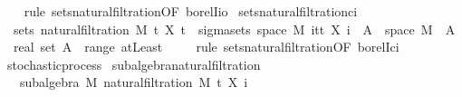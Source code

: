 \begin{isabellebody}
%
\isadelimproof
\ \ %
\endisadelimproof
%
\isatagproof
{}\isamarkupfalse%
\ {\isacharparenleft}{\kern0pt}rule\ sets{\isacharunderscore}{\kern0pt}natural{\isacharunderscore}{\kern0pt}filtration{\isacharprime}{\kern0pt}{\isacharbrackleft}{\kern0pt}OF\ borel{\isacharunderscore}{\kern0pt}Iio{\isacharbrackright}{\kern0pt}{\isacharparenright}{\kern0pt}%
\endisatagproof
{\isafoldproof}%
%
\isadelimproof
\isanewline
%
\endisadelimproof
\isanewline
{}\isamarkupfalse%
\ sets{\isacharunderscore}{\kern0pt}natural{\isacharunderscore}{\kern0pt}filtration{\isacharunderscore}{\kern0pt}ci{\isacharcolon}{\kern0pt}\isanewline
\ \ {\isachardoublequoteopen}sets\ {\isacharparenleft}{\kern0pt}natural{\isacharunderscore}{\kern0pt}filtration\ M\ t\ X\ t{\isacharparenright}{\kern0pt}\ {\isacharequal}{\kern0pt}\ sigma{\isacharunderscore}{\kern0pt}sets\ {\isacharparenleft}{\kern0pt}space\ M{\isacharparenright}{\kern0pt}\ {\isacharparenleft}{\kern0pt}{\isasymUnion}i{\isasymin}{\isacharbraceleft}{\kern0pt}tt{\isacharbraceright}{\kern0pt}{\isachardot}{\kern0pt}\ {\isacharbraceleft}{\kern0pt}X\ i\ {\isacharminus}{\kern0pt}{\isacharbackquote}{\kern0pt}\ A\ {\isasyminter}\ space\ M\ {\isacharbar}{\kern0pt}\ A\ {\isacharcolon}{\kern0pt}{\isacharcolon}{\kern0pt}\ real\ set{\isachardot}{\kern0pt}\ A\ {\isasymin}\ range\ atLeast{\isacharbraceright}{\kern0pt}{\isacharparenright}{\kern0pt}{\isachardoublequoteclose}\ \isanewline
%
\isadelimproof
\ \ %
\endisadelimproof
%
\isatagproof
{}\isamarkupfalse%
\ {\isacharparenleft}{\kern0pt}rule\ sets{\isacharunderscore}{\kern0pt}natural{\isacharunderscore}{\kern0pt}filtration{\isacharprime}{\kern0pt}{\isacharbrackleft}{\kern0pt}OF\ borel{\isacharunderscore}{\kern0pt}Ici{\isacharbrackright}{\kern0pt}{\isacharparenright}{\kern0pt}%
\endisatagproof
{\isafoldproof}%
%
\isadelimproof
\isanewline
%
\endisadelimproof
\isanewline
{}\isamarkupfalse%
\ stochastic{\isacharunderscore}{\kern0pt}process\isanewline
{}\isanewline
\isanewline
{}\isamarkupfalse%
\ subalgebra{\isacharunderscore}{\kern0pt}natural{\isacharunderscore}{\kern0pt}filtration{\isacharcolon}{\kern0pt}\ \isanewline
\ \ \ {\isachardoublequoteopen}subalgebra\ M\ {\isacharparenleft}{\kern0pt}natural{\isacharunderscore}{\kern0pt}filtration\ M\ t\ X\ i{\isacharparenright}{\kern0pt}{\isachardoublequoteclose}\ \isanewline
%
\isadelimproof
\ \ %
\endisadelimproof
%
\isatagproof

\end{isabellebody}
